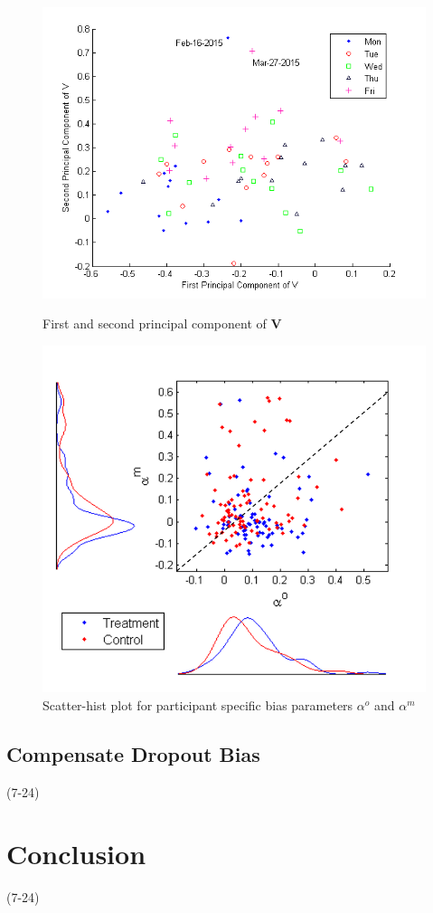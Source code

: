 \documentclass[preprint,12pt]{elsarticle}
\begin{document}
\begin{figure}[!htb]
\centering
\includegraphics[scale=0.6]{VFirstTwo.png}
\caption{First and second principal component of $\mathbf{V}$}
\label{fig:VFirstTwo}
\centering
\includegraphics[scale=0.6]{ParaAlpha.png}
\caption{Scatter-hist plot for participant specific bias parameters $\alpha^o$ and $\alpha^m$}
\label{fig:AlphaMO}

\end{figure}

\subsection{Compensate Dropout Bias} (7-24)

\section{Conclusion} (7-24)
\end{document}
